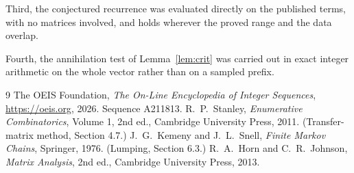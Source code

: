 \documentclass[11pt,a4paper]{article}
\theoremstyle{plain}
\theoremstyle{definition}
\begin{document}
Third, the conjectured recurrence was evaluated directly on the published terms, with no
matrices involved, and holds wherever the proved range and the data overlap.

Fourth, the annihilation test of Lemma~\ref{lem:crit} was carried out in exact integer
arithmetic on the whole vector rather than on a sampled prefix.

\begin{thebibliography}{9}
 The OEIS Foundation, \emph{The On-Line Encyclopedia of Integer
Sequences}, \url{https://oeis.org}, 2026. Sequence A211813.
 R.~P.~Stanley, \emph{Enumerative Combinatorics}, Volume 1, 2nd ed.,
Cambridge University Press, 2011. (Transfer-matrix method, Section 4.7.)
 J.~G.~Kemeny and J.~L.~Snell, \emph{Finite Markov Chains}, Springer, 1976.
(Lumping, Section 6.3.)
 R.~A.~Horn and C.~R.~Johnson, \emph{Matrix Analysis}, 2nd ed., Cambridge
University Press, 2013.
\end{thebibliography}
\end{document}
